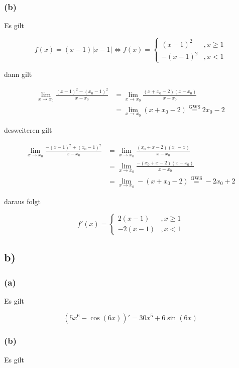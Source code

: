 \documentclass[a4paper, 11pt]{article}
\begin{document}
\subsubsection{(b)}
\label{sec:org9306a9e}
Es gilt

$$ f(x) = (x-1)|x-1| \Leftrightarrow f(x) =
    \begin{cases}
        (x-1)^2 &, x \geq 1 \\
        -(x-1)^2 &, x < 1
    \end{cases} $$

dann gilt

\begin{align*}
    \lim_{x \rightarrow x_0} \frac{(x - 1)^2 - (x_0 - 1)^2}{x - x_0} &=
        \lim_{x \rightarrow x_0} \frac{(x + x_0 - 2)(x - x_0)}{x - x_0} \\
    &= \lim_{x \rightarrow x_0} (x + x_0 - 2)
        \overset{\text{GWS}}{=} 2x_0 - 2
\end{align*}

desweiteren gilt

\begin{align*}
    \lim_{x \rightarrow x_0} \frac{-(x - 1)^2 + (x_0 - 1)^2}{x - x_0} &=
        \lim_{x \rightarrow x_0} \frac{(x_0 + x - 2)(x_0 - x)}{x - x_0} \\
    &= \lim_{x \rightarrow x_0} \frac{-(x_0 + x - 2)(x - x_0)}{x - x_0} \\
    &= \lim_{x \rightarrow x_0} -(x + x_0 - 2)
        \overset{\text{GWS}}{=} -2x_0 + 2
\end{align*}

daraus folgt

$$ f'(x) =
    \begin{cases}
        2(x-1) &, x \geq 1 \\
        -2(x-1) &, x < 1
    \end{cases} $$

\subsection{b)}
\label{sec:org46a5c61}
\subsubsection{(a)}
\label{sec:org66d9636}
Es gilt

$$ (5x^6 - \cos(6x))' = 30x^5 + 6\sin(6x) $$

\subsubsection{(b)}
\label{sec:org421f1e3}
Es gilt
\end{document}
